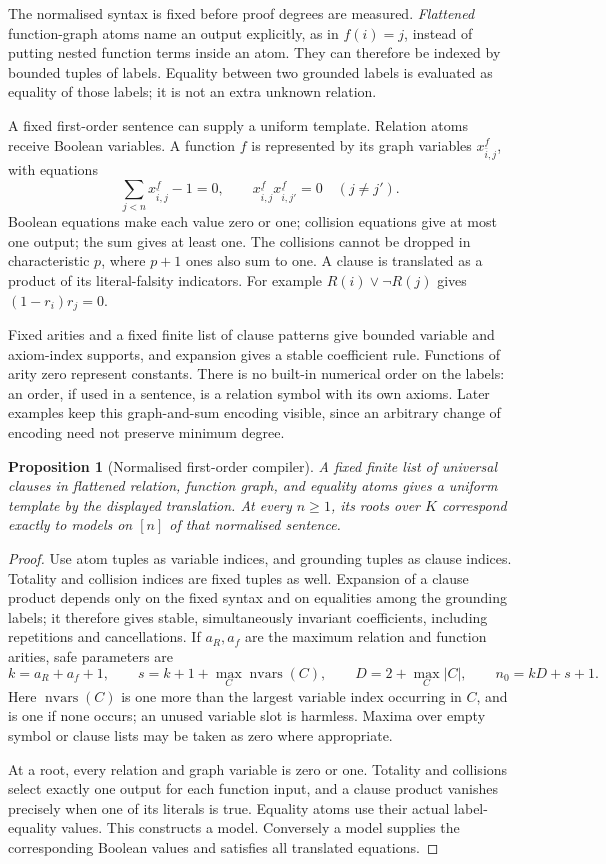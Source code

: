 \documentclass[11pt,a4paper,oneside,openany]{book}
\newtheorem{proposition}[theorem]{Proposition}
\theoremstyle{definition}\newtheorem{definition}[theorem]{Definition}
\theoremstyle{remark}\newtheorem{remark}[theorem]{Remark}
\numberwithin{equation}{chapter}
\begin{document}
The normalised syntax is fixed before proof degrees are measured.
\emph{Flattened} function-graph atoms name an output explicitly,
as in $f(i)=j$, instead of putting nested function terms inside an
atom. They can therefore be indexed by bounded tuples of labels.
Equality between two grounded labels is evaluated as equality of
those labels; it is not an extra unknown relation.

A fixed first-order sentence can supply a uniform template. Relation
atoms receive Boolean variables. A function $f$ is represented by its
graph variables $x^f_{\bar i,j}$, with equations
\[
 \sum_{j<n}x^f_{\bar i,j}-1=0,\qquad
 x^f_{\bar i,j}x^f_{\bar i,j'}=0\quad(j\ne j').
\]
Boolean equations make each value zero or one; collision equations give
at most one output; the sum gives at least one. The collisions cannot
be dropped in characteristic $p$, where $p+1$ ones also sum to one.
A clause is translated as a product of its literal-falsity indicators.
For example $R(i)\vee\neg R(j)$ gives $(1-r_i)r_j=0$.

Fixed arities and a fixed finite list of clause patterns give bounded
variable and axiom-index supports, and expansion gives a stable
coefficient rule. Functions of arity zero represent constants. There
is no built-in numerical order on the labels: an order, if used in a
sentence, is a relation symbol with its own axioms. Later examples keep
this graph-and-sum encoding visible, since an arbitrary change of
encoding need not preserve minimum degree.

\begin{proposition}[Normalised first-order compiler]\label{tx:prop:compiler}
A fixed finite list of universal clauses in flattened relation, function
graph, and equality atoms gives a uniform template by the displayed
translation. At every $n\ge1$, its roots over $K$ correspond exactly
to models on $[n]$ of that normalised sentence.
\end{proposition}
\begin{proof}
Use atom tuples as variable indices, and grounding tuples as clause
indices. Totality and collision indices are fixed tuples as well.
Expansion of a clause product depends only on the fixed syntax and on
equalities among the grounding labels; it therefore gives stable,
simultaneously invariant coefficients, including repetitions and
cancellations. If $a_R,a_f$ are the maximum relation and function
arities, safe parameters are
\[
 k=a_R+a_f+1,\qquad s=k+1+\max_C\operatorname{nvars}(C),\qquad
 D=2+\max_C|C|,\qquad n_0=kD+s+1.
\]
Here $\operatorname{nvars}(C)$ is one more than the largest variable
index occurring in $C$, and is one if none occurs; an unused variable
slot is harmless. Maxima over empty symbol or clause lists may be taken
as zero where appropriate.

At a root, every relation and graph variable is zero or one. Totality
and collisions select exactly one output for each function input, and
a clause product vanishes precisely when one of its literals is true.
Equality atoms use their actual label-equality values. This constructs
a model. Conversely a model supplies the corresponding Boolean values
and satisfies all translated equations.
\end{proof}
\end{document}
